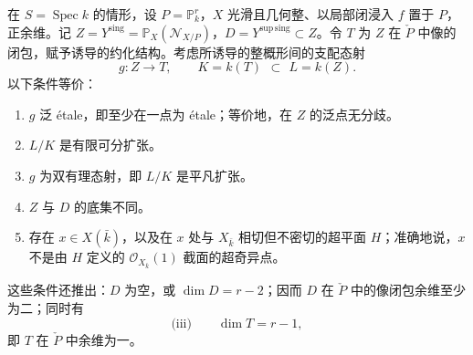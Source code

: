 \begingroup
\def\PP{\mathbb P}\def\OO{\mathcal O}\def\Ocal{\mathcal O}
\def\F{\mathcal F}\def\G{\mathcal G}\def\N{\mathcal N}
\def\PD{\check P}\def\Pdual{\check P}
\def\Ys{Y^{\mathrm{sing}}}\def\Ysing{Y^{\mathrm{sing}}}
\def\Ds{Y^{\mathrm{sup\,sing}}}\def\Ysup{Y^{\mathrm{sup\,sing}}}
\def\cod{\operatorname{codim}}\def\Sing{\operatorname{Sing}}
\def\depth{\operatorname{depth}}\def\coprof{\operatorname{coprof}}
\def\Ass{\operatorname{Ass}}\def\Supp{\operatorname{Supp}}
\def\Gr{\operatorname{Gr}}\def\Spec{\operatorname{Spec}}\def\Proj{\operatorname{Proj}}
在 $S=\Spec k$ 的情形，设 $P=\mathbb P^r_k$，$X$ 光滑且几何整、以局部闭浸入 $f$ 置于 $P$，正余维。记 $Z=\Ys=\mathbb P_X(\mathcal N_{X/P})$，$D=\Ds\subset Z$。令 $T$ 为 $Z$ 在 $\PD$ 中像的闭包，赋予诱导的约化结构。考虑所诱导的整概形间的支配态射
\[
 g:Z\longrightarrow T,\qquad K=k(T)\ \,\subset\,\ L=k(Z).
\]
以下条件等价：
\begin{enumerate}
\renewcommand{\labelenumi}{\textnormal{(\roman{enumi})}}
\item $g$ 泛 étale，即至少在一点为 étale；等价地，在 $Z$ 的泛点无分歧。
\item[(i bis)] $L/K$ 是有限可分扩张。
\item[(i ter)] $g$ 为双有理态射，即 $L/K$ 是平凡扩张。
\item[(ii)] $Z$ 与 $D$ 的底集不同。
\item[(ii bis)] 存在 $x\in X(\bar k)$，以及在 $x$ 处与 $X_{\bar k}$ 相切但不密切的超平面 $H$；准确地说，$x$ 不是由 $H$ 定义的 $\mathcal O_{X_{\bar k}}(1)$ 截面的超奇异点。
\end{enumerate}
这些条件还推出：$D$ 为空，或 $\dim D=r-2$；因而 $D$ 在 $\PD$ 中的像闭包余维至少为二；同时有
\[
 \text{(iii)}\qquad \dim T=r-1,
\]
即 $T$ 在 $\PD$ 中余维为一。


